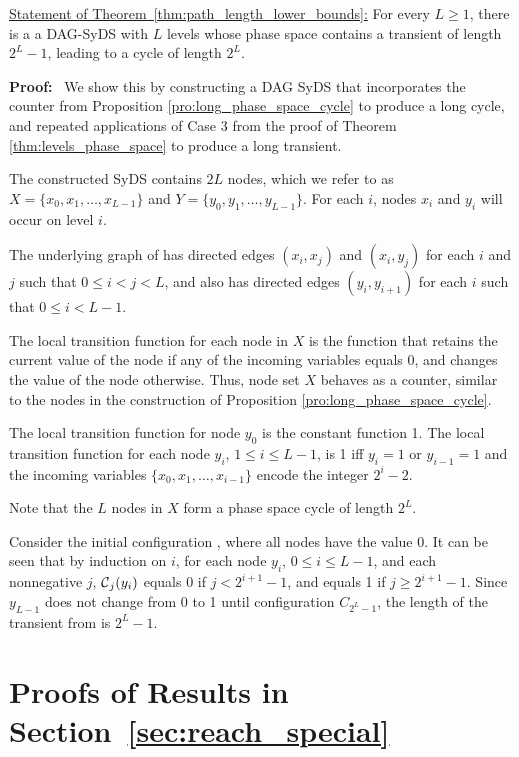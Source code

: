 \medskip

\noindent
\underline{Statement of Theorem~\ref{thm:path_length_lower_bounds}:}
For every $L  \geq 1$,
there is a a DAG-SyDS with $L$ levels
whose phase space contains a transient of length $2^L-1$,
leading to a cycle of length $2^L$.

\medskip

\noindent
\textbf{Proof:}~ 
We show this by constructing a DAG SyDS that
incorporates the counter from Proposition \ref{pro:long_phase_space_cycle}
to produce a long cycle, and repeated applications of Case 3 from
the proof of Theorem \ref{thm:levels_phase_space} to produce a long
transient.

The constructed SyDS \cals{}  contains
$2L$ nodes, which we refer to as $X = \{x_0, x_1, \dots , x_{L-1}\}$ 
and $Y = \{y_0, y_1, \dots , y_{L-1}\}$.
For each $i$, nodes $x_i$ and $y_i$ will occur on level $i$.

The underlying graph of \cals{} has directed edges
$(x_i, x_j)$  and $(x_i, y_j)$ for each $i$ and $j$  such that $0 \leq i < j  < L$,
and also has directed edges $(y_i, y_{i+1})$ for each $i$ such that $0 \leq i < L-1$.

The local transition function for each node in $X$ is the function 
that retains the current value of the node if any of the incoming variables equals 0,
and changes the value of the node otherwise.
Thus, node set $X$ behaves as a counter,
similar to the nodes in the construction of 
Proposition \ref{pro:long_phase_space_cycle}.

The local transition function for node $y_0$ is the constant function
1.  The local transition function for each node $y_i$, $1 \leq i
\leq L-1$, is 1 iff $y_i = 1$ or $y_{i-1} = 1$ and the incoming
variables $\{x_0, x_1, \dots , x_{i-1}\}$ encode the integer $2^i-2$.

Note that the $L$ nodes in $X$ form a phase space cycle of length $2^L$.

Consider the initial configuration \calc{}, where all nodes have the value 0.
It can be seen that by induction on $i$, for each node $y_i$, $0 \leq i \leq L-1$,
and each nonnegative $j$, 
$\mbox{$\mathcal{C}$}_j(y_i)$ equals 0 if $j < 2^{i+1} -1$, and equals 1 if $j \geq 2^{i+1} -1$.
Since $y_{L-1}$ does not change from 0 to 1 until configuration $C_{2^L-1}$, 
the length of the transient from \calc{} is $2^L-1$.
\QED

\section{Proofs of Results in Section~\ref{sec:reach_special}}

